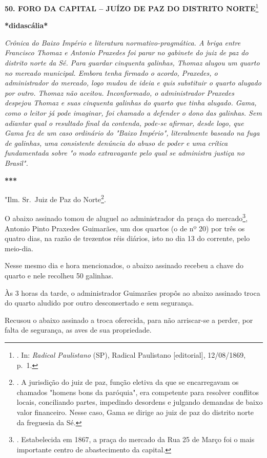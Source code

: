 \textbf{50. FORO DA CAPITAL -- JUÍZO DE PAZ DO DISTRITO
NORTE}\footnote{. In: \emph{Radical Paulistano} (SP), Radical Paulistano
  {[}editorial{]}, 12/08/1869, p.~1.}

\textbf{*didascália*}

\emph{Crônica do Baixo Império e literatura normativo-pragmática. A
briga entre Francisco Thomaz e Antonio Praxedes foi parar no gabinete do
juiz de paz do distrito norte da Sé. Para guardar cinquenta galinhas,
Thomaz alugou um quarto no mercado municipal. Embora tenha firmado o
acordo, Praxedes, o administrador do mercado, logo mudou de ideia e quis
substituir o quarto alugado por outro. Thomaz não aceitou. Inconformado,
o administrador Praxedes despejou Thomaz e suas cinquenta galinhas do
quarto que tinha alugado. Gama, como o leitor já pode imaginar, foi
chamado a defender o dono das galinhas. Sem adiantar qual o resultado
final da contenda, pode-se afirmar, desde logo, que Gama fez de um caso
ordinário do "Baixo Império", literalmente baseado na fuga de galinhas,
uma consistente denúncia do abuso de poder e uma crítica fundamentada
sobre "o modo extravagante pelo qual se administra justiça no Brasil".}

\textbf{***}

"Ilm. Sr.~Juiz de Paz do Norte\footnote{. A jurisdição do juiz de paz,
  função eletiva da que se encarregavam os chamados "homens bons da
  paróquia", era competente para resolver conflitos locais, conciliando
  partes, impedindo desordens e julgando demandas de baixo valor
  financeiro. Nesse caso, Gama se dirige ao juiz de paz do distrito
  norte da freguesia da Sé.}.

O abaixo assinado tomou de aluguel ao administrador da praça do
mercado\footnote{. Estabelecida em 1867, a praça do mercado da Rua 25 de
  Março foi o mais importante centro de abastecimento da capital.},
Antonio Pinto Praxedes Guimarães, um dos quartos (o de nº 20) por três
os quatro dias, na razão de trezentos réis diários, isto no dia 13 do
corrente, pelo meio-dia.

Nesse mesmo dia e hora mencionados, o abaixo assinado recebeu a chave do
quarto e nele recolheu 50 galinhas.

Às 3 horas da tarde, o administrador Guimarães propôs ao abaixo assinado
troca do quarto aludido por outro desconsertado e sem segurança.

Recusou o abaixo assinado a troca oferecida, para não arriscar-se a
perder, por falta de segurança, as aves de sua propriedade.

